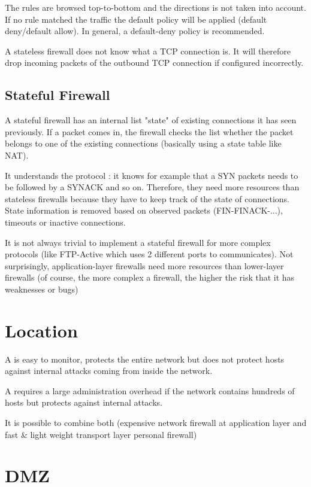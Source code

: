 The rules are browsed top-to-bottom and the directions is not taken into account. If no rule matched the traffic the default policy will be applied (default deny/default allow). In general, a default-deny policy is recommended.

A stateless firewall does not know what a TCP connection is. It will therefore drop incoming packets of the outbound TCP connection if configured incorrectly.

\subsection{Stateful Firewall}

A stateful firewall has an internal list "state" of existing connections it has seen previously. If a packet comes in, the firewall checks the list whether the packet belongs to one of the existing connections (basically using a state table like NAT).

It understands the protocol : it knows for example that a SYN packets needs to be followed by a SYNACK and so on. Therefore, they need more resources than stateless firewalls because they have to keep track of the state of connections. State information is removed based on observed packets (FIN-FINACK-...), timeouts or inactive connections.

It is not always trivial to implement a stateful firewall for more complex protocols (like FTP-Active which uses 2 different ports to communicates). Not surprisingly, application-layer firewalls need more resources than lower-layer firewalls (of course, the more complex a firewall, the higher the risk that it has weaknesses or bugs)

\section{Location}

A  is easy to monitor, protects the entire network but does not protect hosts against internal attacks coming from inside the network.

A  requires a large administration overhead if the network contains hundreds of hosts but protects against internal attacks.

It is possible to combine both (expensive network firewall at application layer and fast \& light weight transport layer personal firewall)

\section{DMZ}

